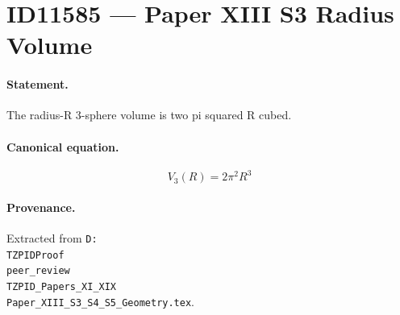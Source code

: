 \section*{ID11585 --- Paper XIII S3 Radius Volume}

\paragraph{Statement.}
The radius-R 3-sphere volume is two pi squared R cubed.

\paragraph{Canonical equation.}
\[
V_3(R)=2\pi^2R^3
\]

\paragraph{Provenance.}
Extracted from \texttt{D:\\TZPIDProof\\peer\_review\\TZPID\_Papers\_XI\_XIX\\Paper\_XIII\_S3\_S4\_S5\_Geometry.tex}.
